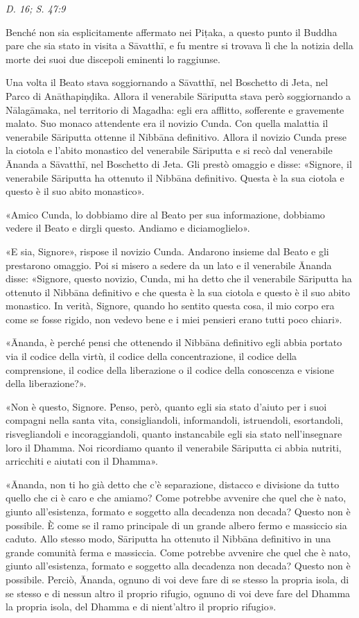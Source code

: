 \emph{D. 16; S. 47:9}


 Benché non sia esplicitamente affermato nei Piṭaka, a
questo punto il Buddha pare che sia stato in visita a Sāvatthī, e fu
mentre si trovava lì che la notizia della morte dei suoi due discepoli
eminenti lo raggiunse.


 Una volta il Beato stava soggiornando a Sāvatthī, nel
Boschetto di Jeta, nel Parco di Anāthapiṇḍika. Allora il venerabile
Sāriputta stava però soggiornando a Nālagāmaka, nel territorio di
Magadha: egli era afflitto, sofferente e gravemente malato. Suo monaco
attendente era il novizio Cunda. Con quella malattia il venerabile
Sāriputta ottenne il Nibbāna definitivo. Allora il novizio Cunda prese
la ciotola e l’abito monastico del venerabile Sāriputta e si recò dal
venerabile Ānanda a Sāvatthī, nel Boschetto di Jeta. Gli prestò omaggio
e disse: «Signore, il venerabile Sāriputta ha ottenuto il Nibbāna
definitivo. Questa è la sua ciotola e questo è il suo abito monastico».


«Amico Cunda, lo dobbiamo dire al Beato per sua informazione, dobbiamo
vedere il Beato e dirgli questo. Andiamo e diciamoglielo».


«E sia, Signore», rispose il novizio Cunda. Andarono insieme dal Beato e
gli prestarono omaggio. Poi si misero a sedere da un lato e il
venerabile Ānanda disse: «Signore, questo novizio, Cunda, mi ha detto
che il venerabile Sāriputta ha ottenuto il Nibbāna definitivo e che
questa è la sua ciotola e questo è il suo abito monastico. In verità,
Signore, quando ho sentito questa cosa, il mio corpo era come se fosse
rigido, non vedevo bene e i miei pensieri erano tutti poco chiari».


«Ānanda, è perché pensi che ottenendo il Nibbāna definitivo egli abbia
portato via il codice della virtù, il codice della concentrazione, il
codice della comprensione, il codice della liberazione o il codice della
conoscenza e visione della liberazione?».


«Non è questo, Signore. Penso, però, quanto egli sia stato d’aiuto per i
suoi compagni nella santa vita, consigliandoli, informandoli,
istruendoli, esortandoli, risvegliandoli e incoraggiandoli, quanto
instancabile egli sia stato nell’insegnare loro il Dhamma. Noi
ricordiamo quanto il venerabile Sāriputta ci abbia nutriti, arricchiti e
aiutati con il Dhamma».


«Ānanda, non ti ho già detto che c’è separazione, distacco e divisione
da tutto quello che ci è caro e che amiamo? Come potrebbe avvenire che
quel che è nato, giunto all’esistenza, formato e soggetto alla decadenza
non decada? Questo non è possibile. È come se il ramo principale di un
grande albero fermo e massiccio sia caduto. Allo stesso modo, Sāriputta
ha ottenuto il Nibbāna definitivo in una grande comunità ferma e
massiccia. Come potrebbe avvenire che quel che è nato, giunto
all’esistenza, formato e soggetto alla decadenza non decada? Questo non
è possibile. Perciò, Ānanda, ognuno di voi deve fare di se stesso la
propria isola, di se stesso e di nessun altro il proprio rifugio, ognuno
di voi deve fare del Dhamma la propria isola, del Dhamma e di
nient’altro il proprio rifugio».


